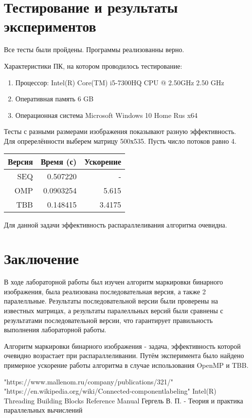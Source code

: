 \documentclass{report}
\begin{document}
\section*{Тестирование и результаты экспериментов}
Все тесты были пройдены. Программы реализованны верно.
\par Характеристики ПК, на котором проводилось тестирование:
\begin{enumerate}
    \item Процессор: Intel(R) Core(TM) i5-7300HQ CPU @ 2.50GHz   2.50 GHz
    \item Оперативная память 6 GB
    \item Операционная система Microsoft Windows 10 Home Rus x64
\end{enumerate}
\par Тесты с разными размерами изображения показывают разную эффективность. Для опререлённости выберем матрицу 500х535.
Пусть число потоков равно 4.
\begin{table}[!h]
\centering
\begin{tabular}{| r | r | r |}
\hline
Версия & Время (с) & Ускорение \\[5pt]
\hline
SEQ & 0.507220 & -     \\
OMP & 0.0903254 & 5.615 \\
TBB & 0.148415 & 3.4175 \\
\hline
\end{tabular}
\end{table}
\par Для данной задачи эффективность распараллеливания алгоритма очевидна.

\newpage
\section*{Заключение}
В ходе лабораторной работы был изучен алгоритм маркировки бинарного изображения, была реализована последовательная версия, а также 2 паралелльные. Результаты последовательной версии были проверены на известных матрицах, а результаты паралелльных версий были сравнены с результатами последовательной версии, что гарантирует правильность выполнения лабораторной работы.
\par Алгоритм маркировки бинарного изображения - задача, эффективность которой очевидно возрастает при распараллеливании. Путём эксперимента было найдено примерное ускорение работы алгоритма в случае использования OpenMP и TBB.

\newpage
	\begin{thebibliography}{1}
		 "https://www.mallenom.ru/company/publications/321/"
		 "https://en.wikipedia.org/wiki/Connected-componentlabeling"
		 Intel(R) Threading Building Blocks Reference Manual
		 Гергель В. П. - Теория и практика параллельных вычислений
	\end{thebibliography}
\end{document}
